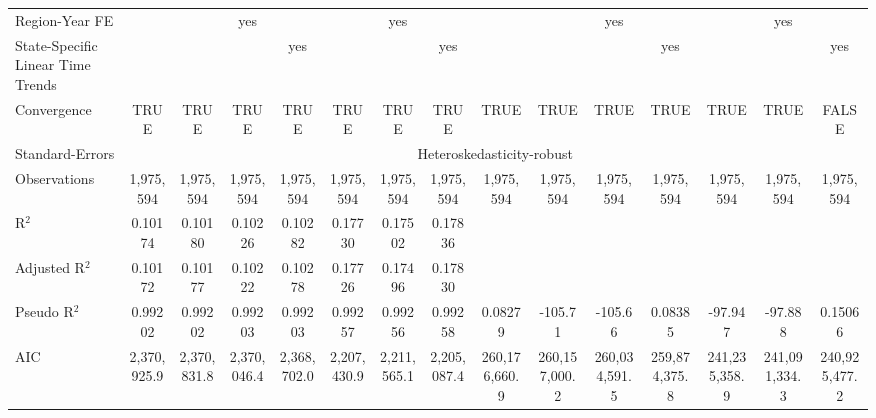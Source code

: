 \documentclass[
]{article}
\let\origtable\table
\let\endorigtable\endtable
\renewenvironment{table}[1][ht]{
      \expandafter\origtable\expandafter[H]
    }{
      \endorigtable
    }
\begin{document}
\begin{table}[htbp]
\begin{adjustbox}{width = 1.5\textwidth, center}
\begin{threeparttable}[b]
\begin{tabular}{lcccccccccccccc}
            Region-Year FE                            &                &                & yes            &                &                & yes            &                &                &                & yes            &                &                & yes            & \\  
            State-Specific Linear Time Trends         &                &                &                & yes            &                &                & yes            &                &                &                & yes            &                &                & yes\\  
            \midrule 
            Convergence                               &TRUE            & TRUE           & TRUE           & TRUE           & TRUE           & TRUE           & TRUE           & TRUE           & TRUE           & TRUE           & TRUE           & TRUE           & TRUE           & FALSE\\  
            Standard-Errors & \multicolumn{14}{c}{Heteroskedasticity-robust} \\ 
            Observations                              & 1,975,594      & 1,975,594      & 1,975,594      & 1,975,594      & 1,975,594      & 1,975,594      & 1,975,594      & 1,975,594      & 1,975,594      & 1,975,594      & 1,975,594      & 1,975,594      & 1,975,594      & 1,975,594\\  
            R$^2$                                     & 0.10174        & 0.10180        & 0.10226        & 0.10282        & 0.17730        & 0.17502        & 0.17836        &                &                &                &                &                &                & \\  
            Adjusted R$^2$                            & 0.10172        & 0.10177        & 0.10222        & 0.10278        & 0.17726        & 0.17496        & 0.17830        &                &                &                &                &                &                & \\  
            Pseudo R$^2$                              & 0.99202        & 0.99202        & 0.99203        & 0.99203        & 0.99257        & 0.99256        & 0.99258        & 0.08279        & -105.71        & -105.66        & 0.08385        & -97.947        & -97.888        & 0.15066\\  
            AIC                                       & 2,370,925.9    & 2,370,831.8    & 2,370,046.4    & 2,368,702.0    & 2,207,430.9    & 2,211,565.1    & 2,205,087.4    & 260,176,660.9  & 260,157,000.2  & 260,034,591.5  & 259,874,375.8  & 241,235,358.9  & 241,091,334.3  & 240,925,477.2\\  

\end{tabular}
\end{threeparttable}
\end{adjustbox}
\end{table}
\end{document}
